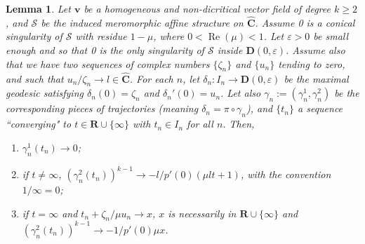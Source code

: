 \documentclass[11pt]{article}
\newtheorem{lemma}[thm]{Lemma}
\begin{document}
\begin{lemma}
    \label{lem:Lemme_gen_sing_con}
    Let $\mathbf{v}$ be a homogeneous and non-dicritical vector field of degree $k\geq2$, and $\mathcal{S}$ be the induced meromorphic affine structure on $\widehat{\mathbf{C}}$. Assume 0 is a conical singularity of $\mathcal{S}$ with residue $1-\mu$, where $0<\operatorname{Re}(\mu)<1$. Let $\varepsilon>0$ be small enough and so that 0 is the only singularity of $\mathcal{S}$ inside $\mathbf{D}(0,\varepsilon)$. Assume also that we have two sequences of complex numbers $\{\zeta_{n}\}$ and $\{u_{n}\}$ tending to zero, and such that $u_{n}/\zeta_{n}\rightarrow l\in\widehat{\mathbf{C}}$. For each $n$, let $\delta_{n}:I_{n}\rightarrow\mathbf{D}(0,\varepsilon)$ be the maximal geodesic satisfying $\delta_{n}(0)=\zeta_{n}$ and $\delta_{n}'(0)=u_{n}$. Let also $\gamma_{n}:=(\gamma_{n}^{1},\gamma_{n}^{2})$ be the corresponding pieces of trajectories (meaning $\delta_{n}=\pi\circ\gamma_{n}$), and $\{t_{n}\}$ a sequence ``converging" to $t\in\mathbf{R}\cup\{\infty\}$ with $t_{n}\in I_{n}$ for all $n$. Then,
    \begin{enumerate}
        \item $\gamma_{n}^{1}(t_{n})\rightarrow0$;
        \item if $t\neq\infty$, $\left(\gamma_{n}^{2}(t_{n})\right)^{k-1}\rightarrow-l/p'(0)(\mu lt+1)$, with the convention $1/\infty=0$;
        \item if $t=\infty$ and $t_{n}+\zeta_{n}/\mu u_{n}\rightarrow x$, $x$ is necessarily in $\mathbf{R}\cup\{\infty\}$ and $\left(\gamma_{n}^{2}(t_{n})\right)^{k-1}\rightarrow-1/p'(0)\mu x$.
    \end{enumerate}
\end{lemma}
\end{document}

